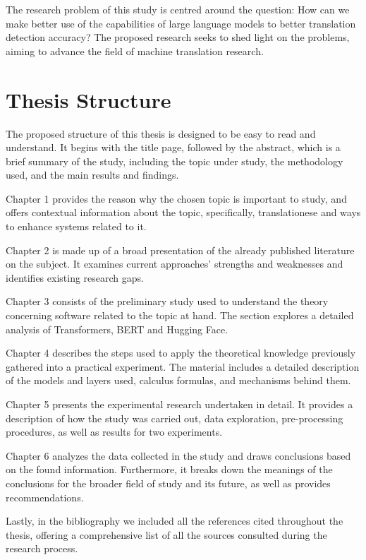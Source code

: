 The research problem of this study is centred around the question: How can we make better use of the capabilities of large language models to better translation detection accuracy? The proposed research seeks to shed light on the problems, aiming to advance the field of machine translation research.


\section{Thesis Structure}


The proposed structure of this thesis is designed to be easy to read and understand. It begins with the title page, followed by the abstract, which is a brief summary of the study, including the topic under study, the methodology used, and the main results and findings.

Chapter 1 provides the reason why the chosen topic is important to study, and offers contextual information about the topic, specifically, translationese and ways to enhance systems related to it.

Chapter 2 is made up of a broad presentation of the already published literature on the subject. It examines current approaches' strengths and weaknesses and identifies existing research gaps.

Chapter 3 consists of the preliminary study used to understand the theory concerning software related to the topic at hand. The section explores a detailed analysis of Transformers, BERT and Hugging Face.

Chapter 4 describes the steps used to apply the theoretical knowledge previously gathered into a practical experiment. The material includes a detailed description of the models and layers used, calculus formulas, and mechanisms behind them.

Chapter 5 presents the experimental research undertaken in detail. It provides a description of how the study was carried out, data exploration, pre-processing procedures, as well as results for two experiments.

Chapter 6 analyzes the data collected in the study and draws conclusions based on the found information. Furthermore, it breaks down the meanings of the conclusions for the broader field of study and its future, as well as provides recommendations.

Lastly, in the bibliography we included all the references cited throughout the thesis, offering a comprehensive list of all the sources consulted during the research process.
